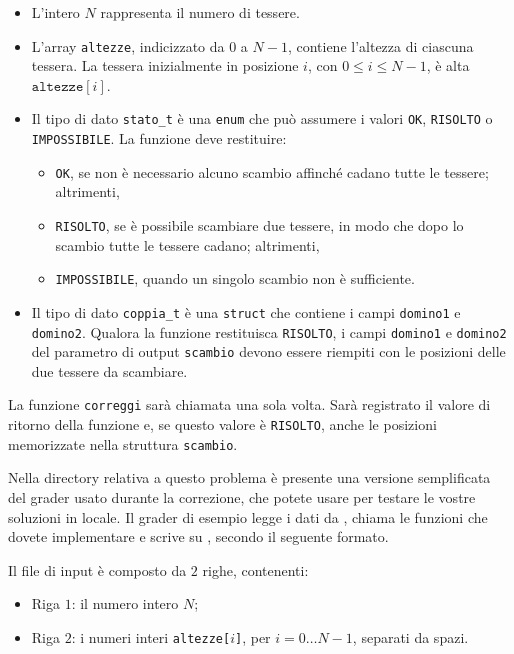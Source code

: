 \begin{itemize}[nolistsep]
  \item L'intero $N$ rappresenta il numero di tessere.
  \item
    L'array \texttt{altezze}, indicizzato da $0$ a $N-1$, contiene l'altezza di ciascuna tessera.
    La tessera inizialmente in posizione $i$, con $0 \leq i \leq N-1$, è alta $\texttt{altezze}[i]$.
  \item
    Il tipo di dato \texttt{stato\_t} è una \texttt{enum} che può assumere i valori
    \texttt{OK}, \texttt{RISOLTO} o \texttt{IMPOSSIBILE}.
    La funzione deve restituire:
    \begin{itemize}
      \item \texttt{OK}, se non è necessario alcuno scambio affinché cadano tutte le tessere; altrimenti,
      \item \texttt{RISOLTO},
        se è possibile scambiare due tessere,
        in modo che dopo lo scambio tutte le tessere cadano; altrimenti,
      \item \texttt{IMPOSSIBILE},
        quando un singolo scambio non è sufficiente.
    \end{itemize}
  \item
    Il tipo di dato \texttt{coppia\_t} è una \texttt{struct} che contiene i campi
    \texttt{domino1} e \texttt{domino2}.
    Qualora la funzione restituisca \texttt{RISOLTO},
    i campi \texttt{domino1} e \texttt{domino2}
    del parametro di output \texttt{scambio}
    devono essere riempiti con le posizioni
    delle due tessere da scambiare.
\end{itemize}

La funzione \texttt{correggi} sarà chiamata una sola volta.
Sarà registrato il valore di ritorno della funzione e,
se questo valore è \texttt{RISOLTO},
anche le posizioni memorizzate nella struttura \texttt{scambio}.



\Grader
Nella directory relativa a questo problema è presente una versione semplificata del grader usato durante la correzione, che potete usare per testare le vostre soluzioni in locale. Il grader di esempio legge i dati da , chiama le funzioni che dovete implementare e scrive su \outputfile{}, secondo il seguente formato.

Il file di input è composto da $2$ righe, contenenti:
\begin{itemize}[nolistsep,itemsep=2mm]
\item Riga $1$: il numero intero $N$;
\item Riga $2$: i numeri interi \texttt{altezze[$i$]}, per $i = 0\ldots N-1$, separati da spazi.
\end{itemize}


